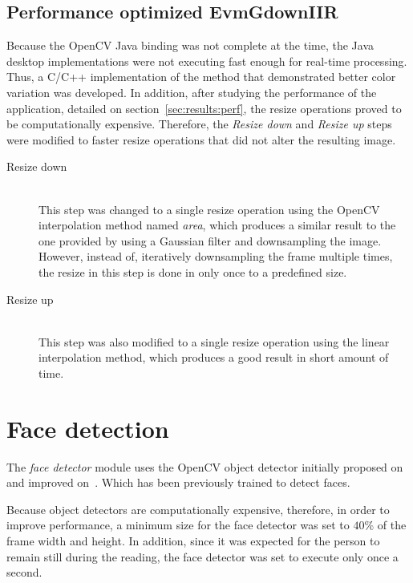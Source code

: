 \subsection{Performance optimized EvmGdownIIR} \label{sec:impl:evm:final}

Because the OpenCV Java binding was not complete at the time, the Java desktop
implementations were not executing fast enough for real-time processing. Thus,
a C/C++ implementation of the method that demonstrated better color variation
was developed. In addition, after studying the performance of the application,
detailed on section~\ref{sec:results:perf}, the resize operations proved to be
computationally expensive. Therefore, the \emph{Resize down} and
\emph{Resize up} steps were modified to faster resize operations that did not
alter the resulting image.

\begin{description}
  \item[Resize down]\hfill\\
        This step was changed to a single resize operation using the
        OpenCV interpolation method named \emph{area}, which produces a similar
        result to the one provided by using a Gaussian filter and downsampling
        the image.
        However, instead of, iteratively downsampling the frame multiple times,
        the resize in this step is done in only once to a predefined size.

  \item[Resize up]\hfill\\
        This step was also modified to a single resize operation using the
        linear interpolation method, which produces a good result in short
        amount of time.
\end{description}

\section{Face detection} \label{sec:impl:face}

The \emph{face detector} module uses the OpenCV object detector initially
proposed on~\cite{Viola2001Rapid} and improved on~\cite{Lienhart2002Extended}.
Which has been previously trained to detect faces.

Because object detectors are computationally expensive, therefore, in order to
improve performance, a minimum size for the face detector was set to $40\%$
of the frame width and height. In addition, since it was expected for the
person to remain still during the reading, the face detector was set to execute
only once a second.


